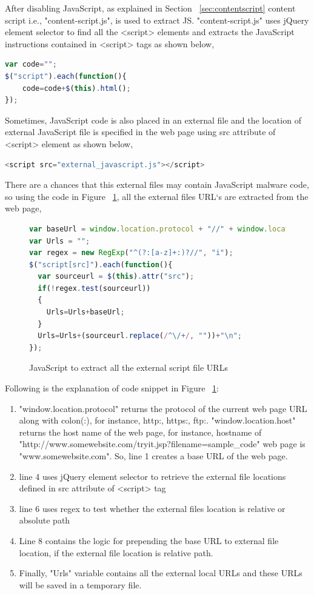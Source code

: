 After disabling JavaScript, as explained in Section ~\ref{sec:contentscript} content script i.e., "content-script.js", is used to extract JS. "content-script.js" uses jQuery element selector to find all the <script> elements and extracts the JavaScript instructions contained in <script> tags as shown below,
\begin{lstlisting}[language=JavaScript,numbers=none,mathescape=false]
var code="";
$("script").each(function(){ 
    code=code+$(this).html();
});
\end{lstlisting}
Sometimes, JavaScript code is also placed in an external file and the location of external JavaScript file is specified in the web page using src attribute of <script> element as shown below,
\begin{lstlisting}[language=JavaScript,numbers=none,mathescape=false]
<script src="external_javascript.js"></script>
\end{lstlisting}
There are a chances that this external files may contain JavaScript malware code, so using the code in Figure ~\ref{fig:extracturls}, all the external files URL`s are extracted from the web page,
\begin{figure}[h]
  \centering
\begin{lstlisting}[frame=single,language=JavaScript,mathescape=false]
var baseUrl = window.location.protocol + "//" + window.location.host + "/";
var Urls = "";
var regex = new RegExp("^(?:[a-z]+:)?//", "i");
$("script[src]").each(function(){
  var sourceurl = $(this).attr("src");
  if(!regex.test(sourceurl))
  {
    Urls=Urls+baseUrl;
  }
  Urls=Urls+(sourceurl.replace(/^\/+/, ""))+"\n";
});
\end{lstlisting}
\caption[JavaScript to extract all the external script file URLs]{JavaScript to extract all the external script file URLs}
    \label{fig:extracturls}
\end{figure}
Following is the explanation of code snippet in Figure ~\ref{fig:extracturls}:
\begin{enumerate}
\item "window.location.protocol" returns the protocol of the current web page URL along with colon(:), for instance, http:, https:, ftp:. "window.location.host" returns the host name of the web page, for instance, hostname of "http://www.somewebsite.com/tryit.jsp?filename=sample\_code" web page is "www.somewebsite.com". So, line 1 creates a base URL of the web page.
\item line 4 uses jQuery element selector to retrieve the external file locations defined in src attribute of <script> tag
\item line 6 uses regex to test whether the external files location is relative or absolute path
\item Line 8 contains the logic for prepending the base URL to external file location, if the external file location is relative path.
\item Finally, "Urls" variable contains all the external local URLs and these URLs will be saved in a temporary file.  
\end{enumerate}


